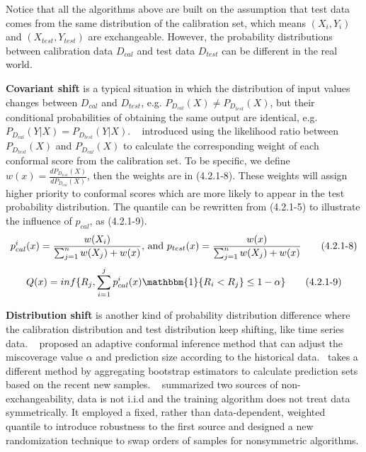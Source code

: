 Notice that all the algorithms above are built on the assumption that test data comes from the same distribution of the calibration set, which means $(X_i, Y_i)$ and $(X_{test}, Y_{test})$ are exchangeable. However, the probability distributions between calibration data $D_{cal}$ and test data $D_{test}$ can be different in the real world. 

\textbf{Covariant shift} is a typical situation in which the distribution of input values changes between $D_{cal}$ and $D_{test}$, e.g. $P_{D_{cal}}(X)\neq P_{D_{test}}(X)$, but their conditional probabilities of obtaining the same output are identical, e.g. $P_{D_{cal}}(Y|X) = P_{D_{test}}(Y|X)$.  ~\cite{tibshirani2019conformal} introduced using the likelihood ratio between $P_{D_{test}}(X)$ and $P_{D_{cal}}(X)$ to calculate the corresponding weight of each conformal score from the calibration set. To be specific, we define $w(x)=\frac{dP_{D_{test}}(X)}{dP_{D_{cal}}(X)}$, then the weights are in (4.2.1-8). These weights will assign higher priority to conformal scores which are more likely to appear in the test probability distribution. The quantile can be rewritten from (4.2.1-5) to illustrate the influence of $p_{cal}$, as (4.2.1-9).
\begin{equation}
p_{cal}^i(x)=\frac{w(X_i)}{\sum_{j=1}^n w(X_j)+w(x)}\text{, and } p_{test}(x)=\frac{w(x)}{\sum_{j=1}^n w(X_j)+w(x)}\\\tag{4.2.1-8}
\end{equation}
\begin{equation}
Q(x) = inf\{R_j,\sum_{i=1}^j p_{cal}^i(x)\mathbbm{1}\{R_i<R_j\}\leq 1-\alpha \}\\\tag{4.2.1-9}
\end{equation}

\textbf{Distribution shift} is another kind of probability distribution difference where the calibration distribution and test distribution keep shifting, like time series data. ~\cite{Gibbs2021AdaptiveCI} proposed an adaptive conformal inference method that can adjust the miscoverage value $\alpha$ and prediction size according to the historical data.~\cite{xu2021conformal} takes a different method by aggregating bootstrap estimators to calculate prediction sets based on the recent new samples. ~\cite{Barber2022ConformalPB} summarized two sources of non-exchangeability, data is not i.i.d and the training algorithm does not treat data symmetrically. It employed a fixed, rather than data-dependent, weighted quantile to introduce robustness to the first source and designed a new randomization technique to swap orders of samples for nonsymmetric algorithms.

